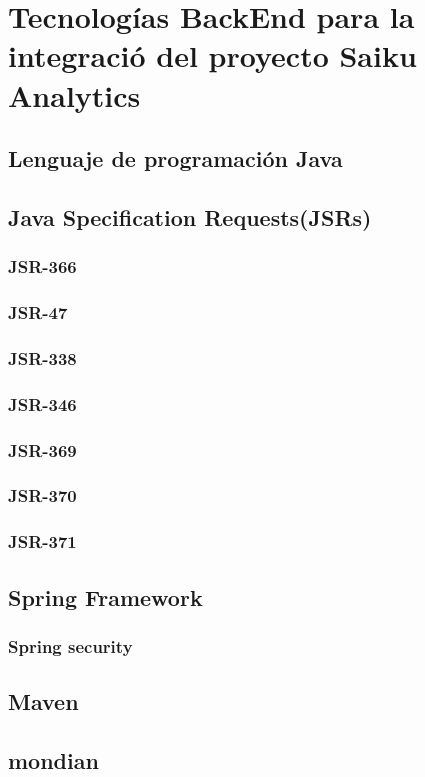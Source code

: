 \section{Tecnolog\'{i}as BackEnd para la integraci\'{o} del proyecto Saiku Analytics}
	\subsection{Lenguaje de programaci\'{o}n Java}
	\subsection{Java Specification Requests(JSRs)}
		\subsubsection{JSR-366}
		\subsubsection{JSR-47}
		\subsubsection{JSR-338}
		\subsubsection{JSR-346}
		\subsubsection{JSR-369}
		\subsubsection{JSR-370}
		\subsubsection{JSR-371}
		\lipsum[1-2]
	\subsection{Spring Framework}
		\subsubsection{Spring security}
	\subsection{Maven}
	\subsection{mondian}

